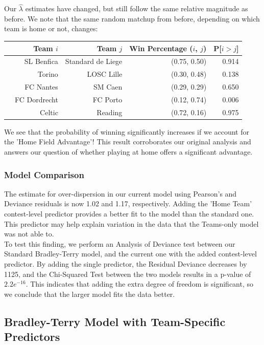 \documentclass{article}
\begin{document}
Our $\hat{\lambda}$ estimates have changed, but still follow the same relative magnitude as before. We note that the same random matchup from before, depending on which team is home or not, changes:

\begin{table}[H]
\centering
\begin{tabular}{rrrrr}
  \hline
 & Team $i$ & Team $j$ & Win Percentage ($i$, $j$) & P[$i > j$] \\ 
  \hline
 & SL Benfica  & Standard de Liege & (0.75, 0.50) & 0.914 \\ 
   & Torino & LOSC Lille & (0.30, 0.48) & 0.138 \\ 
   & FC Nantes & SM Caen & (0.29, 0.29)  & 0.650 \\ 
   & FC Dordrecht & FC Porto & (0.12, 0.74) & 0.006 \\ 
   & Celtic & Reading & (0.72, 0.16) & 0.975 \\ 
   \hline
\end{tabular}
\end{table}

We see that the probability of winning significantly increases if we account for the 'Home Field Advantage'! This result corroborates our original analysis and answers our question of whether playing at home offers a significant advantage.\\

\subsubsection{Model Comparison}

The estimate for over-dispersion in our current model using Pearson's and Deviance residuals is now 1.02 and 1.17, respectively. Adding the 'Home Team' contest-level predictor provides a better fit to the model than the standard one. This predictor may help explain variation in the data that the Teams-only model was not able to.\\

To test this finding, we perform an Analysis of Deviance test between our Standard Bradley-Terry model, and the current one with the added contest-level predictor. By adding the single predictor, the Residual Deviance decreases by 1125, and the Chi-Squared Test between the two models results in a p-value of $2.2e^{-16}$. This indicates that adding the extra degree of freedom is significant, so we conclude that the larger model fits the data better.

\subsection{Bradley-Terry Model with Team-Specific Predictors}
 
\end{document}
